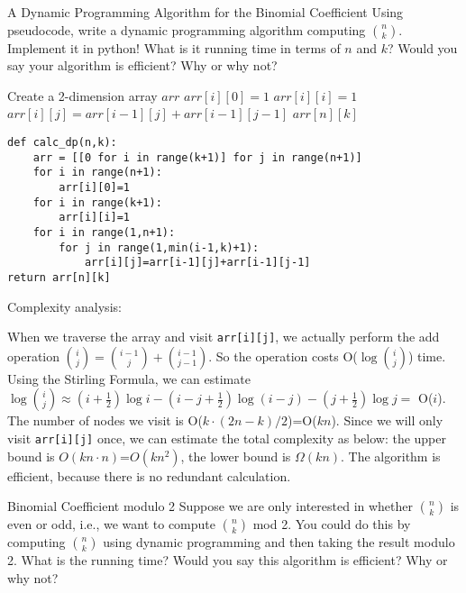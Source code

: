\documentclass[UTF8, a4paper, linespread=1.5]{article}
\begin{document}
\begin{thm}{A Dynamic Programming Algorithm for the Binomial Coefficient}{}
    Using pseudocode, 
    write a dynamic programming algorithm computing  $\binom{n}{k}$.  Implement it in python!  What is it running 
    time in terms of $n$ and $k$? Would you say your algorithm is efficient?  Why or why not?
    
\end{thm}
\begin{algorithm}
    \caption{Caluculate Binomial Coefficient Using DP}
    \begin{algorithmic}
        \STATE Create a 2-dimension array $arr$
        \STATE $arr[i][0]=1$
        \ENDFOR
        \STATE $arr[i][i]=1$
        \ENDFOR
        \STATE $arr[i][j]=arr[i-1][j]+arr[i-1][j-1]$
        \ENDFOR
        \ENDFOR
        \RETURN $arr[n][k]$
    \end{algorithmic}
\end{algorithm}
\begin{verbatim}
def calc_dp(n,k):
    arr = [[0 for i in range(k+1)] for j in range(n+1)]
    for i in range(n+1):
        arr[i][0]=1
    for i in range(k+1):
        arr[i][i]=1
    for i in range(1,n+1):
        for j in range(1,min(i-1,k)+1):
            arr[i][j]=arr[i-1][j]+arr[i-1][j-1]
return arr[n][k]
\end{verbatim}
Complexity analysis:

 When we traverse the array and visit \texttt{arr[i][j]}, we actually perform the add operation $\binom{i}{j}=\binom{i-1}{j}+\binom{i-1}{j-1}$. So the operation costs O($\log\binom{i}{j}$) time. Using the Stirling Formula, we can estimate $\log\binom{i}{j}\approx(i+\frac{1}{2})\log i-(i-j+\frac{1}{2})\log (i-j)-(j+\frac{1}{2})\log j =$ O($i$). The number of nodes we visit is O($k\cdot (2n-k)/2$)=O($kn$). Since we will only visit \texttt{arr[i][j]} once, we can estimate the total complexity as below: the upper bound is $O(kn\cdot n)$=$O(kn^2)$, the lower bound is $\Omega(kn)$. The algorithm is efficient, because there is no redundant calculation.
 
 
 \begin{thm}{Binomial Coefficient modulo 2}{}
     Suppose we are only interested in whether $\binom{n}{k}$ is even or odd, i.e., we want to compute $\binom{n}{k}$ mod 2. You could do this by computing  $\binom{n}{k}$ using dynamic programming and then taking the result modulo 2. What is the running time? Would you say this algorithm is efficient? Why or why not?
    
 \end{thm}
\end{document}
